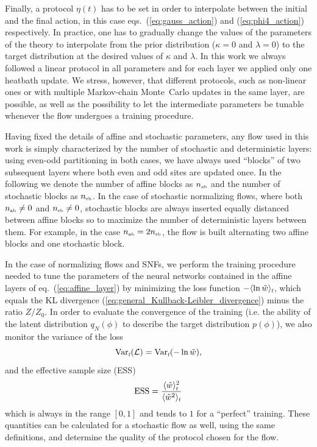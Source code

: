 \documentclass[11pt]{article}
\newcommand{\nab}{n_{\mbox{\tiny{ab}}}}
\newcommand{\nsb}{n_{\mbox{\tiny{sb}}}}
\begin{document}
Finally, a protocol $\eta(t)$ has to be set in order to interpolate between the initial and the final action, in this case eqs.~(\ref{eq:gauss_action}) and (\ref{eq:phi4_action}) respectively. In practice, one has to gradually change the values of the parameters of the theory to interpolate from the prior distribution ($\kappa=0$ and $\lambda=0$) to the target distribution at the desired values of $\kappa$ and $\lambda$. In this work we always followed a linear protocol in all parameters and for each layer we applied only one heatbath update. We stress, however, that different protocols, such as non-linear ones or with multiple Markov-chain Monte~Carlo updates in the same layer, are possible, as well as the possibility to let the intermediate parameters be tunable whenever the flow undergoes a training procedure. 

Having fixed the details of affine and stochastic parameters, any flow used in this work is simply characterized by the number of stochastic and deterministic layers: using even-odd partitioning in both cases, we have always used ``blocks'' of two subsequent layers where both even and odd sites are updated once. In the following we denote the number of affine blocks as $\nab$ and the number of stochastic blocks as $\nsb$. In the case of stochastic normalizing flows, where both $\nab \neq 0$ and $\nsb \neq 0$, stochastic blocks are always inserted equally distanced between affine blocks so to maximize the number of deterministic layers between them. For example, in the case $\nab = 2 \nsb$, the flow is built alternating two affine blocks and one stochastic block.

In the case of normalizing flows and SNFs, we perform the training procedure needed to tune the parameters of the neural networks contained in the affine layers of eq.~(\ref{eq:affine_layer}) by minimizing the loss function $-\langle \ln \tilde{w} \rangle_{\mbox{\tiny{f}}}$, which equals the KL divergence (\ref{eq:general_Kullback-Leibler_divergence}) minus the ratio $Z/Z_0$. In order to evaluate the convergence of the training (i.e. the ability of the latent distribution $q_N(\phi)$ to describe the target distribution $p(\phi)$), we also monitor the variance of the loss
\begin{equation}
\mbox{Var}_{\mbox{\tiny{f}}} (\mathcal{L}) = \mbox{Var}_{\mbox{\tiny{f}}} (-\ln \tilde{w}), 
\end{equation}
and the effective sample size (ESS)
\begin{equation}
 \label{eq:ESS}
\mbox{ESS} = \frac{\langle \tilde{w}\rangle_{\mbox{\tiny{f}}}^2}{\langle \tilde{w}^2 \rangle_{\mbox{\tiny{f}}}}
\end{equation}
which is always in the range $[0,1]$ and tends to $1$ for a ``perfect'' training. These quantities can be calculated for a stochastic flow as well, using the same definitions, and determine the quality of the protocol chosen for the flow.
\end{document}
